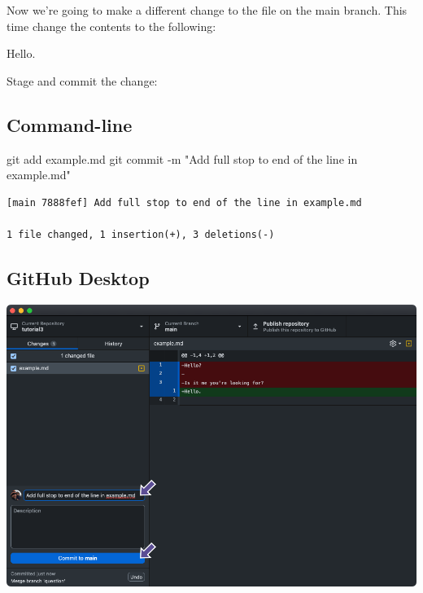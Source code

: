 \documentclass[
  letterpaper,
  DIV=11,
  numbers=noendperiod]{scrartcl}
\newenvironment{Shaded}{\begin{snugshade}}{\end{snugshade}}
\newcommand{\AttributeTok}[1]{\textcolor[rgb]{0.40,0.45,0.13}{#1}}
\newcommand{\FunctionTok}[1]{\textcolor[rgb]{0.28,0.35,0.67}{#1}}
\newcommand{\NormalTok}[1]{\textcolor[rgb]{0.00,0.23,0.31}{#1}}
\newcommand{\StringTok}[1]{\textcolor[rgb]{0.13,0.47,0.30}{#1}}
\begin{document}
Now we're going to make a different change to the file on the main
branch. This time change the contents to the following:

\begin{tcolorbox}[enhanced jigsaw, coltitle=black, colback=white, colbacktitle=quarto-callout-note-color!10!white, breakable, bottomrule=.15mm, colframe=quarto-callout-note-color-frame, left=2mm, toptitle=1mm, leftrule=.75mm, toprule=.15mm, title=\textcolor{quarto-callout-note-color}{\faInfo}\hspace{0.5em}{example.md}, titlerule=0mm, arc=.35mm, bottomtitle=1mm, rightrule=.15mm, opacitybacktitle=0.6, opacityback=0]

Hello.

\end{tcolorbox}

Stage and commit the change:

\subsection{Command-line}

\begin{Shaded}
\begin{Highlighting}[]
\FunctionTok{git}\NormalTok{ add example.md}
\FunctionTok{git}\NormalTok{ commit }\AttributeTok{{-}m} \StringTok{"Add full stop to end of the line in example.md"}
\end{Highlighting}
\end{Shaded}

\begin{verbatim}
[main 7888fef] Add full stop to end of the line in example.md

1 file changed, 1 insertion(+), 3 deletions(-)
\end{verbatim}

\subsection{GitHub Desktop}

\includegraphics{images/image50.png}
\end{document}
